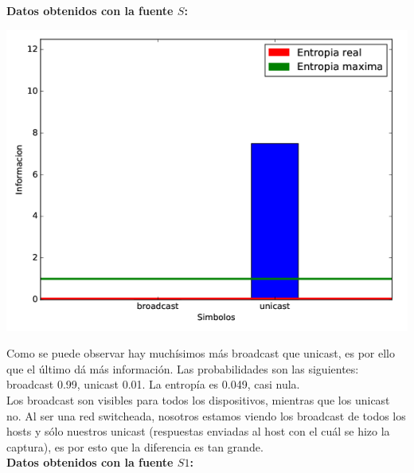 \textbf{Datos obtenidos con la fuente $S$:}

\begin{center}
\includegraphics[scale=0.6]{imagenes/analisisTCORPcableada/fuenteS.png} 
\end{center}

Como se puede observar hay muchísimos más broadcast que unicast, es por ello que el último dá más información. Las probabilidades son las siguientes: broadcast 0.99, unicast 0.01. La entropía es 0.049, casi nula.\\

Los broadcast son visibles para todos los dispositivos, mientras que los unicast no. Al ser una red switcheada, nosotros estamos viendo los broadcast de todos los hosts y sólo nuestros unicast (respuestas enviadas al host con el cuál se hizo la captura), es por esto que la diferencia es tan grande.\\

\textbf{Datos obtenidos con la fuente $S1$:}

